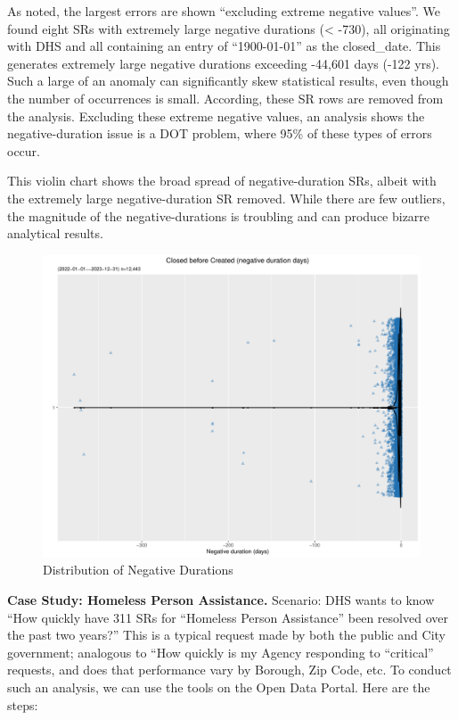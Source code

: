 \documentclass[linenumber]{jdsart}
\begin{document}
	
As noted, the largest errors are shown ``excluding extreme negative values''. We found 
eight SRs with extremely large negative durations (\textless{} -730), all originating
with DHS and all containing an entry of ``1900-01-01'' as the closed\_date. This 
generates extremely large negative durations exceeding -44,601 
days (-122 yrs). Such a large of an anomaly can significantly skew statistical 
results, even though the number of occurrences is small. According, these 
SR rows are removed from the analysis. Excluding these extreme negative
values, an analysis shows the negative-duration issue is a DOT problem, 
where 95\% of these types of errors occur. 
	
	
This violin chart shows the broad spread of negative-duration SRs, albeit with 
the extremely large negative-duration SR removed. While there are few 
outliers, the magnitude of the negative-durations is troubling and can 
produce bizarre analytical results.


\begin{figure}[tbp]
	 \centering
 	 \includegraphics[width = \textwidth]{negative_duration_SR_violin.pdf}
 \caption{Distribution of Negative Durations}
 \label{fig:negative-duration-violin}
\end{figure}


\label{sec:homlessassistance}
\textbf{Case Study: Homeless Person Assistance.} Scenario: DHS wants to know ``How 
quickly have 311 SRs for ``Homeless Person Assistance'' been resolved 
over the past two years?'' This is a typical request made by 
both the public and City government; analogous to ``How quickly 
is my Agency responding to ``critical'' requests, and does 
that performance vary by Borough, Zip Code, etc. To conduct such an 
analysis, we can use the tools on the Open Data Portal. Here are the steps:
		
\end{document}
